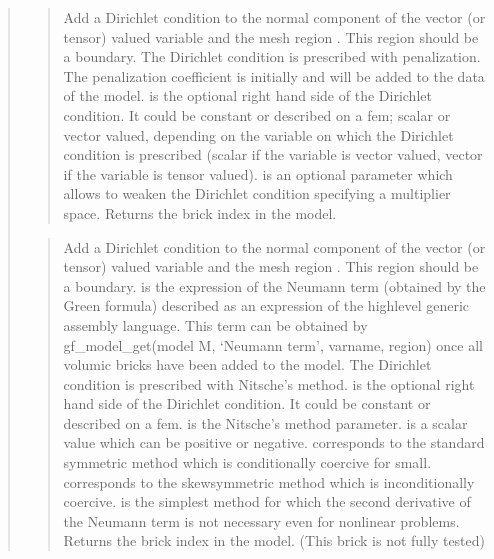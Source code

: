 \documentclass[a4paper,11pt,english]{sphinxmanual}
\begin{document}
\begin{quote}
\sphinxAtStartPar
{}
\begin{quote}

\sphinxAtStartPar
Add a Dirichlet condition to the normal component of the vector
(or tensor) valued variable  and the mesh
region . This region should be a boundary. The Dirichlet
condition is prescribed with penalization. The penalization coefficient
is initially  and will be added to the data of the model.
 is the optional right hand side of the Dirichlet condition.
It could be constant or described on a fem; scalar or vector valued,
depending on the variable on which the Dirichlet condition is prescribed
(scalar if the variable
is vector valued, vector if the variable is tensor valued).
 is an optional parameter which allows to weaken the
Dirichlet condition specifying a multiplier space.
Returns the brick index in the model.
\end{quote}

\sphinxAtStartPar
{}
\begin{quote}

\sphinxAtStartPar
Add a Dirichlet condition to the normal component of the vector
(or tensor) valued variable  and the mesh region .
This region should be a boundary. 
is the expression of the Neumann term (obtained by the Green formula)
described as an expression of the high\sphinxhyphen{}level
generic assembly language. This term can be obtained by
gf\_model\_get(model M, ‘Neumann term’, varname, region) once all volumic bricks have
been added to the model. The Dirichlet
condition is prescribed with Nitsche’s method.  is the optional
right hand side of the Dirichlet condition. It could be constant or
described on a fem.  is the
Nitsche’s method parameter.  is a scalar value which can be
positive or negative.  corresponds to the standard symmetric
method which is conditionally coercive for   small.
 corresponds to the skew\sphinxhyphen{}symmetric method which is
inconditionally coercive.  is the simplest method
for which the second derivative of the Neumann term is not necessary
even for nonlinear problems.
Returns the brick index in the model.
(This brick is not fully tested)
\end{quote}


\end{quote}
\end{document}
